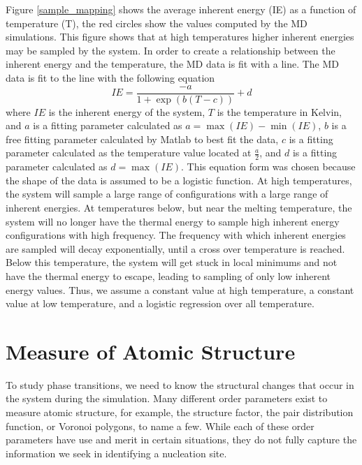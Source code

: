 Figure \ref{sample_mapping} shows the average inherent energy (IE) as a function of temperature (T), the red circles show the values computed by the MD simulations.  This figure shows that at high temperatures higher inherent energies may be sampled by the system.  In order to create a relationship between the inherent energy and the temperature, the MD data is fit with a line.  The MD data is fit to the line with the following equation
\begin{equation}
IE = \frac{-a}{1+\exp\left(b\left(T-c\right)\right)} + d
\end{equation}
where $IE$ is the inherent energy of the system, $T$ is the temperature in Kelvin, and $a$ is a fitting parameter calculated as $a=\max\left(IE\right) - \min\left(IE\right)$, $b$ is a free fitting parameter calculated by Matlab to best fit the data, $c$ is a fitting parameter calculated as the temperature value located at $\frac{a}{2}$, and $d$ is a fitting parameter calculated as $d=\max\left(IE\right)$.  This equation form was chosen because the shape of the data is assumed to be a logistic function.  At high temperatures, the system will sample a large range of configurations with a large range of inherent energies.  At temperatures below, but near the melting temperature, the system will no longer have the thermal energy to sample high inherent energy configurations with high frequency.  The frequency with which inherent energies are sampled will decay exponentially, until a cross over temperature is reached.  Below this temperature, the system will get stuck in local minimums and not have the thermal energy to escape, leading to sampling of only low inherent energy values.  Thus, we assume a constant value at high temperature, a constant value at low temperature, and a logistic regression over all temperature.

\section{Measure of Atomic Structure}
\label{bop_calculation}
To study phase transitions, we need to know the structural changes that occur in the system during the simulation.  Many different order parameters exist to measure atomic structure, for example, the structure factor, the pair distribution function, or Voronoi polygons, to name a few.  While each of these order parameters have use and merit in certain situations, they do not fully capture the information we seek in identifying a nucleation site.  


